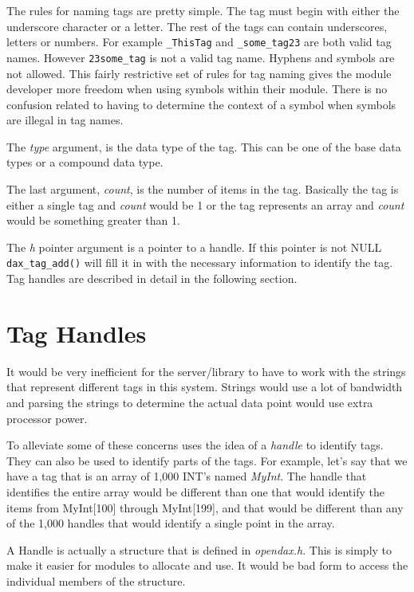 The rules for naming tags are pretty simple.  The tag must begin with either the underscore character or a letter.  The rest of the tags can contain underscores, letters or numbers.  For example \verb|_ThisTag| and \verb|_some_tag23| are both valid tag names.  However \verb|23some_tag| is not a valid tag name.  Hyphens and symbols are not allowed.  This fairly restrictive set of rules for tag naming gives the module developer more freedom when using symbols within their module.  There is no confusion related to having to determine the context of a symbol when symbols are illegal in tag names.

The \emph{type} argument, is the data type of the tag.  This can be one of the base data types or a compound data type.

The  last argument, \emph{count}, is the number of items in the tag.  Basically the tag is either a single tag and \emph{count} would be 1 or the tag represents an array and \emph{count} would be something greater than 1.

The \emph{h} pointer argument is a pointer to a handle.  If this pointer is not NULL \verb|dax_tag_add()| will fill it in with the necessary information to identify the tag.  Tag handles are described in detail in the following section.

\section{Tag Handles}
It would be very inefficient for the server/library to have to work with the strings that represent different tags in this system.  Strings would use a lot of bandwidth and parsing the strings to determine the actual data point would use extra processor power.

To alleviate some of these concerns \opendax uses the idea of a \emph{handle} to identify tags.  They can also be used to identify parts of the tags.  For example, let's say that we have a tag that is an array of 1,000 INT's named \emph{MyInt}.  The handle that identifies the entire array would be different than one that would identify the items from MyInt[100] through MyInt[199], and that would be different than any of the 1,000 handles that would identify a single point in the array.

A Handle is actually a structure that is defined in \emph{opendax.h}.  This is simply to make it easier for modules to allocate and use.  It would be bad form to access the individual members of the structure.

